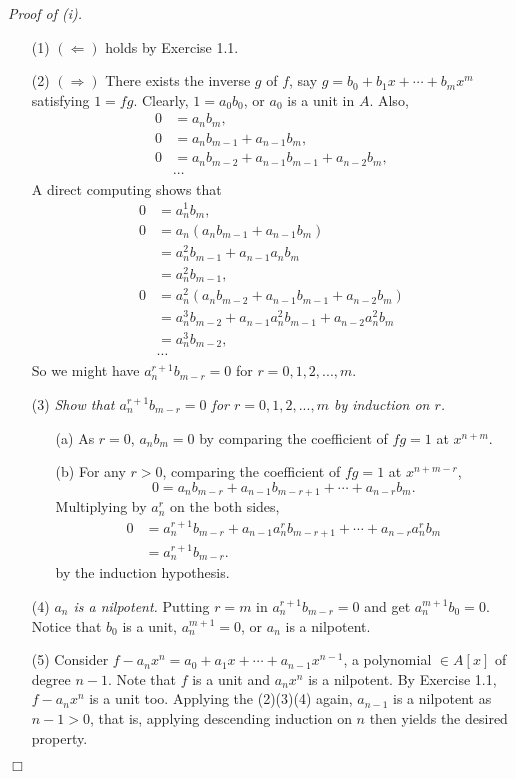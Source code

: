 \documentclass{article}
\begin{document}
\emph{Proof of (i).}
\begin{enumerate}
\item[(1)]
$(\Longleftarrow)$ holds by Exercise 1.1.
\item[(2)]
$(\Longrightarrow)$
There exists the inverse $g$ of $f$, say $g = b_0 + b_1 x + \cdots + b_m x^m$
satisfying
$1 = fg$.
Clearly, $1 = a_0 b_0$, or $a_0$ is a unit in $A$.
Also,
\begin{align*}
0
&= a_n b_m, \\
0
&= a_n b_{m-1} + a_{n-1} b_m, \\
0
&= a_n b_{m-2} + a_{n-1} b_{m-1} + a_{n-2} b_m, \\
& \cdots
\end{align*}
A direct computing shows that
\begin{align*}
0
&= a_n^{1} b_m, \\
0
&= a_n (a_n b_{m-1} + a_{n-1} b_m) \\
&= a_n^{2} b_{m-1} + a_{n-1} a_n b_m \\
&= a_n^{2} b_{m-1}, \\
0
&= a_n^{2} (a_n b_{m-2} + a_{n-1} b_{m-1} + a_{n-2} b_m) \\
&= a_n^{3} b_{m-2} + a_{n-1} a_n^{2} b_{m-1} + a_{n-2} a_n^{2} b_m \\
&= a_n^{3} b_{m-2}, \\
& \cdots
\end{align*}
So we might have $a_n^{r+1} b_{m-r} = 0$ for $r = 0, 1, 2, ..., m$.
\item[(3)]
\emph{Show that $a_n^{r+1} b_{m-r} = 0$ for $r = 0, 1, 2, ..., m$
by induction on $r$.}
\begin{enumerate}
\item[(a)]
As $r = 0$, $a_n b_m = 0$ by comparing the coefficient of $fg = 1$ at $x^{n+m}$.
\item[(b)]
For any $r > 0$, comparing the coefficient of $fg = 1$ at $x^{n+m-r}$,
$$0 = a_n b_{m-r} + a_{n-1} b_{m-r+1} + \cdots + a_{n-r} b_m.$$
Multiplying by $a_n^r$ on the both sides,
\begin{align*}
0
&= a_n^{r+1} b_{m-r} + a_{n-1} a_n^{r} b_{m-r+1} + \cdots + a_{n-r} a_n^{r} b_m \\
&= a_n^{r+1} b_{m-r}.
\end{align*}
by the induction hypothesis.
\end{enumerate}
\item[(4)]
\emph{$a_n$ is a nilpotent.}
Putting $r = m$ in $a_n^{r+1} b_{m-r} = 0$ and get $a_n^{m+1} b_0 = 0$.
Notice that $b_0$ is a unit, $a_n^{m+1} = 0$, or $a_n$ is a nilpotent.
\item[(5)]
Consider $f - a_n x^n = a_0 + a_1 x + \cdots + a_{n-1} x^{n-1}$,
a polynomial $\in A[x]$ of degree $n-1$.
Note that $f$ is a unit and $a_n x^n$ is a nilpotent.
By Exercise 1.1, $f - a_n x^n$ is a unit too.
Applying the (2)(3)(4) again, $a_{n-1}$ is a nilpotent as $n-1 > 0$,
that is, applying descending induction on $n$ then yields the desired property.
\end{enumerate}
$\Box$ \\
\end{document}
